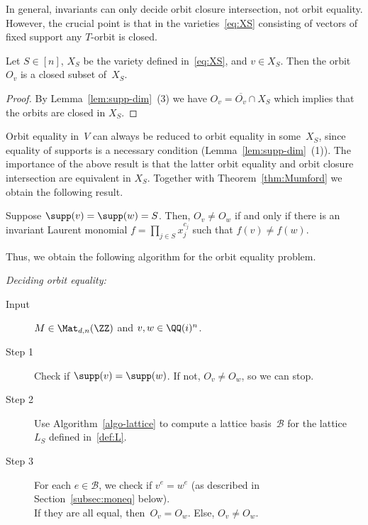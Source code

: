 In general, invariants can only decide orbit closure intersection, not orbit equality.
However, the crucial point is that in the varieties~\eqref{eq:XS} consisting of vectors of fixed support any $T$-orbit is closed.

\begin{proposition}\label{prop:X orbits closed}
Let $S \in [n]$, $X_S$ be the variety defined in~\eqref{eq:XS}, and $v \in X_S$.
Then the orbit $O_v$ is a closed subset of~$X_S$.
\end{proposition}
\begin{proof}
By Lemma~\ref{lem:supp-dim}~(3) we have $O_v=\overline{O_v}\cap X_S$ which implies that the orbits are closed in $X_S$.
\end{proof}

Orbit equality in~$V$ can always be reduced to orbit equality in some~$X_S$, since equality of supports is a necessary condition (Lemma~\ref{lem:supp-dim}~(1)).
The importance of the above result is that the latter orbit equality and orbit closure intersection are equivalent in $X_S$.
Together with Theorem~\ref{thm:Mumford} we obtain the following result.

\begin{corollary}\label{cor:orb sup}
Suppose $\supp(v) = \supp(w) = S$.
Then, $O_v \neq O_w$ if and only if there is an invariant Laurent monomial $f = \prod_{j \in S} x_j^{c_j}$ such that $f(v) \neq f(w)$.
\end{corollary}

Thus, we obtain the following algorithm for the orbit equality problem.

\begin{algorithm}\label{algo-oe} \emph{Deciding orbit equality:}
\begin{description}
\item [Input] $M \in \Mat_{d,n}(\ZZ)$ and $v,w \in \QQ(i)^n$.
\item [Step 1] Check if $\supp(v) = \supp(w)$. If not, $O_v \neq O_w$, so we can stop.
\item [Step 2] Use Algorithm~\ref{algo-lattice} to compute a lattice basis~$\mathcal B$ for the lattice~$L_S$ defined in~\eqref{def:L}.
\item [Step 3] For each $e \in \mathcal{B}$, we check if $v^e = w^e$ (as described in Section~\ref{subsec:moneq} below). \\
If they are all equal, then~$O_v = O_w$. Else, $O_v \neq O_w$.
\end{description}
\end{algorithm}

